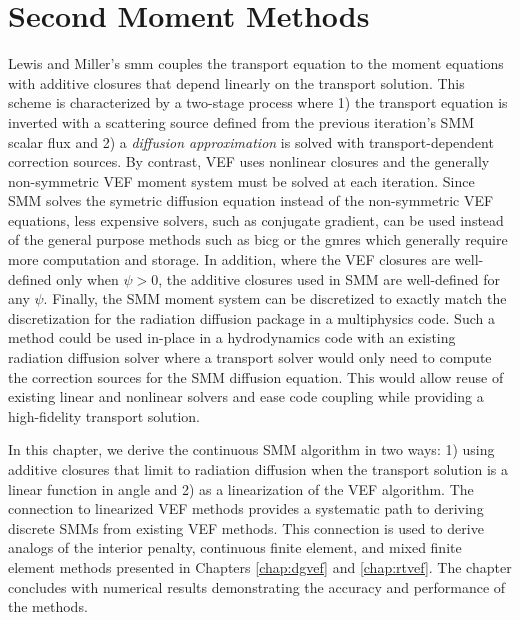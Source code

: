 \documentclass[../doc.tex]{subfiles}
\begin{document}
\chapter{Second Moment Methods} \label{chap:smm}
Lewis and Miller's \cite{lewis_miller} \gls{smm} couples the transport equation to the moment equations with additive closures that depend linearly on the transport solution. This scheme is characterized by a two-stage process where 1) the transport equation is inverted with a scattering source defined from the previous iteration's SMM scalar flux and 2) a \emph{diffusion approximation} is solved with transport-dependent correction sources. By contrast, VEF uses nonlinear closures and the generally non-symmetric VEF moment system must be solved at each iteration. Since SMM solves the symetric diffusion equation instead of the non-symmetric VEF equations, less expensive solvers, such as conjugate gradient, can be used instead of the general purpose methods such as \gls{bicg} or the \gls{gmres} which generally require more computation and storage. In addition, where the VEF closures are well-defined only when $\psi>0$, the additive closures used in SMM are well-defined for any $\psi$. Finally, the SMM moment system can be discretized to exactly match the discretization for the radiation diffusion package in a multiphysics code. Such a method could be used in-place in a hydrodynamics code with an existing radiation diffusion solver where a transport solver would only need to compute the correction sources for the SMM diffusion equation. 
This would allow reuse of existing linear and nonlinear solvers and ease code coupling while providing a high-fidelity transport solution. 

In this chapter, we derive the continuous SMM algorithm in two ways: 1) using additive closures that limit to radiation diffusion when the transport solution is a linear function in angle and 2) as a linearization of the VEF algorithm. The connection to linearized VEF methods provides a systematic path to deriving discrete SMMs from existing VEF methods. This connection is used to derive analogs of the interior penalty, continuous finite element, and mixed finite element methods presented in Chapters \ref{chap:dgvef} and \ref{chap:rtvef}. The chapter concludes with numerical results demonstrating the accuracy and performance of the methods. 
\end{document}
